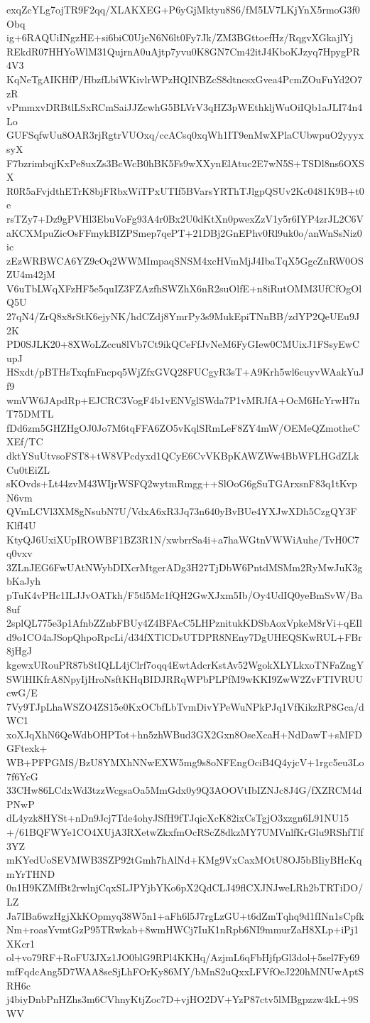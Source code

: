 exqZcYLg7ojTR9F2qq/XLAKXEG+P6yGjMktyu8S6/fM5LV7LKjYnX5rmoG3f0Obq
ig+6RAQUiINgzHE+si6biC0UjeN6N6lt0Fy7Jk/ZM3BGttoefHz/RqgvXGkajlYj
REkdR07HHYoWlM31QujrnA0uAjtp7yvu0K8GN7Cm42itJ4KboKJzyq7HpygPR4V3
KqNeTgAIKHfP/HbzfLbiWKivlrWPzHQINBZcS8dtncsxGvea4PcmZOuFuYd2O7zR
vPmmxvDRBtlLSxRCmSaiJJZcwhG5BLVrV3qHZ3pWEthkljWuOiIQb1aJLI74n4Lo
GUFSqfwUu8OAR3rjRgtrVUOxq/ccACsq0xqWh1IT9enMwXPlaCUbwpuO2yyyxsyX
F7bzrimbqjKxPe8uxZs3BcWcB0hBK5Fs9wXXynElAtuc2E7wN5S+TSDl8ns6OXSX
R0R5aFvjdthETrK8bjFRbxWiTPxUTIf5BVarsYRThTJlgpQSUv2Kc0481K9B+t0e
rsTZy7+Dz9gPVHl3EbuVoFg93A4r0Bx2U0dKtXn0pwexZzV1y5r6IYP4zrJL2C6V
aKCXMpuZicOsFFmykBIZPSmep7qePT+21DBj2GnEPhv0Rl9uk0o/anWnSsNiz0ic
zEzWRBWCA6YZ9cOq2WWMImpaqSNSM4xcHVmMjJ4IbaTqX5GgcZnRW0OSZU4m42jM
V6uTbLWqXFzHF5e5quIZ3FZAzfhSWZhX6nR2suOlfE+n8iRutOMM3UfCfOgOlQ5U
27qN4/ZrQ8x8rStK6ejyNK/hdCZdj8YmrPy3s9MukEpiTNnBB/zdYP2QeUEu9J2K
PD0SJLK20+8XWoLZccu8lVb7Ct9ikQCeFfJvNeM6FyGIew0CMUixJ1FSsyEwCupJ
HSxdt/pBTHsTxqfnFncpq5WjZfxGVQ28FUCgyR3sT+A9Krh5wl6cuyvWAakYuJf9
wmVW6JApdRp+EJCRC3VogF4b1vENVglSWda7P1vMRJfA+OcM6HcYrwH7nT75DMTL
fDd6zm5GHZHgOJ0Jo7M6tqFFA6ZO5vKqlSRmLeF8ZY4mW/OEMeQZmotheCXEf/TC
dktYSuUtvsoFST8+tW8VPcdyxd1QCyE6CvVKBpKAWZWw4BbWFLHGdZLkCu0tEiZL
sKOvds+Lt44zvM43WIjrWSFQ2wytmRmgg++SlOoG6gSuTGArxsnF83q1tKvpN6vm
QVmLCVl3XM8gNsubN7U/VdxA6xR3Jq73n640yBvBUe4YXJwXDh5CzgQY3FKlfI4U
KtyQJ6UxiXUpIROWBF1BZ3R1N/xwbrrSa4i+a7haWGtnVWWiAuhe/TvH0C7q0vxv
3ZLnJEG6FwUAtNWybDIXcrMtgerADg3H27TjDbW6PntdMSMm2RyMwJuK3gbKaJyh
pTuK4vPHc1ILJJvOATkh/F5tl5Mc1fQH2GwXJxm5Ib/Oy4UdIQ0yeBmSvW/Ba8uf
2splQL775e3p1AfnbZZnbFBUy4Z4BFAcC5LHPznitukKDSbAoxVpkeM8rVi+qEIl
d9o1CO4aJSopQhpoRpcLi/d34fXTlCDsUTDPR8NEny7DgUHEQSKwRUL+FBr8jHgJ
kgewxURouPR87bStIQLL4jClrf7oqq4EwtAdcrKstAv52WgokXLYLkxoTNFaZngY
SWlHIKfrA8NpyIjHroNsftKHqBIDJRRqWPbPLPfM9wKKI9ZwW2ZvFTIVRUUcwG/E
7Vy9TJpLhaWSZO4ZS15e0KxOCbfLbTvmDivYPeWuNPkPJq1VfKikzRP8Gca/dWC1
xoXJqXhN6QeWdbOHPTot+hn5zhWBud3GX2Gxn8OseXcaH+NdDawT+sMFDGFtexk+
WB+PFPGMS/BzU8YMXhNNwEXW5mg9s8oNFEngOciB4Q4yjcV+1rgc5eu3Lo7f6YcG
33CHw86LCdxWd3tzzWcgsaOa5MmGdx0y9Q3AOOVtIbIZNJc8J4G/fXZRCM4dPNwP
dL4yzk8HYSt+nDn9Jcj7Tde4ohyJSfH9fTJqicXcK82ixCsTgjO3xzgn6L91NU15
+/61BQFWYe1CO4XUjA3RXetwZkxfmOcRScZ8dkzMY7UMVnlfKrGlu9RShfTlf3YZ
mKYedUoSEVMWB3SZP92tGmh7hAlNd+KMg9VxCaxMOtU8OJ5bBIiyBHcKqmYrTHND
0n1H9KZMfBt2rwlnjCqxSLJPYjbYKo6pX2QdCLJ49flCXJNJweLRh2bTRTiDO/LZ
Ja7IBa6wzHgjXkKOpmyq38W5n1+aFh6l5J7rgLzGU+t6dZmTqhq9d1fINn1sCpfk
Nm+roasYvmtGzP95TRwkab+8wmHWCj7IuK1nRpb6NI9mmurZaH8XLp+iPj1XKcr1
ol+vo79RF+RoFU3JXz1JO0blG9RPl4KKHq/AzjmL6qFbHjfpGl3dol+5sel7Fy69
mfFqdcAng5D7WAA8seSjLhFOrKy86MY/bMnS2uQxxLFVfOeJ220hMNUwAptSRH6c
j4biyDnbPnHZhs3m6CVhnyKtjZoc7D+vjHO2DV+YzP87ctv5lMBgpzzw4kL+9SWV
